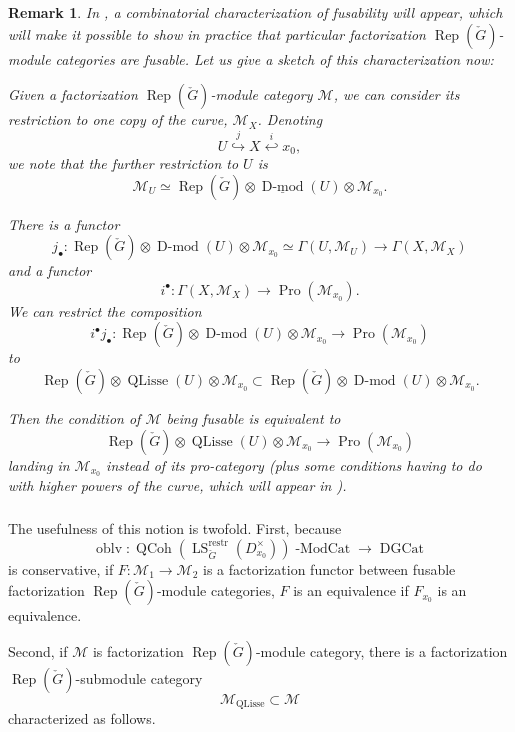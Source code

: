\documentclass[10pt,a4paper]{amsart}
\newtheorem{rem}[subsubsection]{Remark}
\newcommand{\on}[1]{\operatorname{#1}}
\newcommand{\Dmod}{\on{D-mod}}
\newcommand{\QCoh}{\on{QCoh}}
\newcommand{\Gcheck}{\check{G}}
\newcommand{\sssec}[1]{\subsubsection{}}
\begin{document}
\begin{rem}
    In \cite{BCG}, a combinatorial characterization of fusability will appear, which will make it possible to show in practice that particular factorization $\on{Rep}(\Gcheck)$-module categories are fusable. Let us give a sketch of this characterization now:

    Given a factorization $\on{Rep}(\Gcheck)$-module category $\mathcal{M}$, we can consider its restriction to one copy of the curve, $\mathcal{M}_X$. Denoting
    $$
    U \overset{j}{\hookrightarrow} X \overset{i}{\hookleftarrow} x_0,
    $$
    we note that the further restriction to $U$ is
    $$
    \mathcal{M}_U \simeq \on{Rep}(\Gcheck) \otimes \underline{\Dmod}(U) \otimes \mathcal{M}_{x_0}.
    $$

    There is a functor
    $$
    j_{\bullet} : \on{Rep}(\Gcheck) \otimes \Dmod(U) \otimes \mathcal{M}_{x_0} \simeq \Gamma(U, \mathcal{M}_U) \longrightarrow \Gamma(X, \mathcal{M}_X)
    $$
    and a functor
    $$
    i^{\bullet} : \Gamma(X, \mathcal{M}_X) \longrightarrow \on{Pro}(\mathcal{M}_{x_0}).
    $$
    We can restrict the composition
    $$
    i^{\bullet} j_{\bullet} : \on{Rep}(\Gcheck) \otimes \Dmod(U) \otimes \mathcal{M}_{x_0} \to \on{Pro}(\mathcal{M}_{x_0})
    $$
    to
    $$
    \on{Rep}(\Gcheck) \otimes \on{QLisse}(U) \otimes \mathcal{M}_{x_0} \subset \on{Rep}(\Gcheck) \otimes \Dmod(U) \otimes \mathcal{M}_{x_0}.
    $$

    Then the condition of $\mathcal{M}$ being \emph{fusable} is equivalent to
    $$
    \on{Rep}(\Gcheck) \otimes \on{QLisse}(U) \otimes \mathcal{M}_{x_0} \longrightarrow \on{Pro}(\mathcal{M}_{x_0})
    $$
    landing in $\mathcal{M}_{x_0}$ instead of its pro-category (plus some conditions having to do with higher powers of the curve, which will appear in \cite{BCG}).
\end{rem}

\sssec{} \label{useful fusable}
The usefulness of this notion is twofold. First, because
$$
\on{oblv} : \QCoh(\on{LS}_{\Gcheck}^{\on{restr}}(D_{x_0}^{\times}))\on{-ModCat} \longrightarrow \on{DGCat}
$$
is conservative, if $F : \mathcal{M}_1 \longrightarrow \mathcal{M}_2$ is a factorization functor between fusable factorization $\on{Rep}(\Gcheck)$-module categories, $F$ is an equivalence if $F_{x_0}$ is an equivalence.

Second, if $\mathcal{M}$ is factorization $\on{Rep}(\Gcheck)$-module category, there is a factorization $\on{Rep}(\Gcheck)$-submodule category
$$
\mathcal{M}_{\on{QLisse}} \subset \mathcal{M}
$$
characterized as follows.
\end{document}
